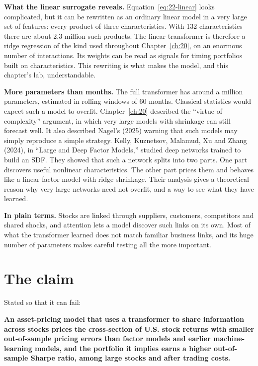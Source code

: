 \textbf{What the linear surrogate reveals.} Equation~\eqref{eq:22-linear} looks complicated, but it can be rewritten as an ordinary linear model in a very large set of features: every product of three characteristics. With 132 characteristics there are about 2.3 million such products. The linear transformer is therefore a ridge regression of the kind used throughout Chapter~\ref{ch:20}, on an enormous number of interactions. Its weights can be read as signals for timing portfolios built on characteristics. This rewriting is what makes the model, and this chapter's lab, understandable.

\textbf{More parameters than months.} The full transformer has around a million parameters, estimated in rolling windows of 60 months. Classical statistics would expect such a model to overfit. Chapter~\ref{ch:20} described the ``virtue of complexity'' argument, in which very large models with shrinkage can still forecast well. It also described Nagel's (2025) warning that such models may simply reproduce a simple strategy. Kelly, Kuznetsov, Malamud, Xu and Zhang (2024), in ``Large and Deep Factor Models,'' studied deep networks trained to build an SDF. They showed that such a network splits into two parts. One part discovers useful nonlinear characteristics. The other part prices them and behaves like a linear factor model with ridge shrinkage. Their analysis gives a theoretical reason why very large networks need not overfit, and a way to see what they have learned.

\noindent\textbf{In plain terms.} Stocks are linked through suppliers, customers, competitors and shared shocks, and attention lets a model discover such links on its own. Most of what the transformer learned does not match familiar business links, and its huge number of parameters makes careful testing all the more important.

\section{The claim}
\label{sec:22-claim}

Stated so that it can fail:

\begin{callout}
\textbf{An asset-pricing model that uses a transformer to share information across stocks prices the cross-section of U.S. stock returns with smaller out-of-sample pricing errors than factor models and earlier machine-learning models, and the portfolio it implies earns a higher out-of-sample Sharpe ratio, among large stocks and after trading costs.}
\end{callout}


